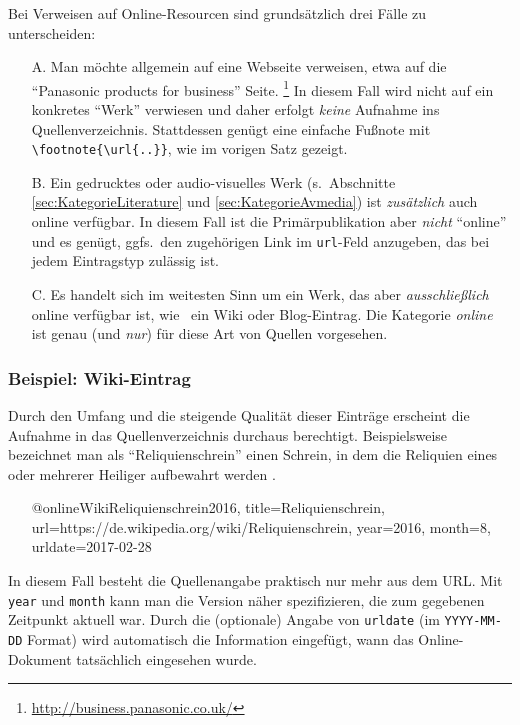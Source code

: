 Bei Verweisen auf Online-Resourcen sind grundsätzlich drei Fälle zu unterscheiden:
%
\begin{itemize}
\item[A.] Man möchte allgemein auf eine Webseite verweisen, etwa auf die 
	"`Panasonic products for business"' Seite.%
	\footnote{\url{http://business.panasonic.co.uk/}}
	In diesem Fall wird nicht auf ein konkretes "`Werk"' verwiesen und daher
	erfolgt \emph{keine} Aufnahme ins Quellenverzeichnis. Stattdessen
	genügt eine einfache Fußnote mit \verb!\footnote{\url{..}}!, wie im vorigen
	Satz gezeigt.
\item[B.] Ein gedrucktes oder audio-visuelles Werk 
	(s.\ Abschnitte \ref{sec:KategorieLiterature} und \ref{sec:KategorieAvmedia})
	ist \emph{zusätzlich} auch online verfügbar. In diesem Fall ist die Primär\-publikation 
	aber \emph{nicht} "`online"' und es genügt, ggfs.\ den zugehörigen Link im 
	\texttt{url}-Feld anzugeben, das bei jedem Eintragstyp zulässig ist.
\item[C.] Es handelt sich im weitesten Sinn um ein Werk, das aber 
	\emph{ausschließlich} online verfügbar ist, wie \zB\ ein Wiki oder Blog-Eintrag.
	Die Kategorie \emph{online} ist genau (und \emph{nur}) für diese 
	Art von Quellen vorgesehen.
\end{itemize}


\subsubsection{Beispiel: Wiki-Eintrag}
\label{sec:@online-www}
Durch den Umfang und die steigende Qualität dieser Einträge erscheint
die Aufnahme in das Quellenverzeichnis durchaus berechtigt.
Beispielsweise bezeichnet man als "`Reliquienschrein"'
einen Schrein, in dem die Reliquien eines oder 
mehrerer Heiliger aufbewahrt werden \cite{WikiReliquienschrein2016}.
%
\begin{itemize}
\item[]
\begin{GenericCode}[numbers=none]
@online{WikiReliquienschrein2016,
	title={Reliquienschrein},
	url={https://de.wikipedia.org/wiki/Reliquienschrein},
  year={2016},
  month={8},
  urldate={2017-02-28}
}
\end{GenericCode}
\item[\cite{WikiReliquienschrein2016}] 
\end{itemize}
%
In diesem Fall besteht die Quellenangabe praktisch nur mehr aus dem URL.
Mit \texttt{year} und \texttt{month} kann man die Version näher spezifizieren, 
die zum gegebenen Zeitpunkt aktuell war.
Durch die (optionale) Angabe von \texttt{urldate} (im \texttt{YYYY-MM-DD} Format) wird automatisch 
die Information eingefügt, wann das Online-Dokument tatsächlich eingesehen wurde.




